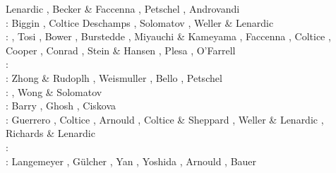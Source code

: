 \begin{scriptsize}
                    Lenardic \etal \cite{lemj11}, Becker \& Faccenna \cite{befa11},
                    Petschel \etal \cite{pewb11}, Androvandi \etal \cite{andl11}\\
\twothousandtwelve: Biggin \etal \cite{bisa12}, Coltice \etal \cite{cort12b}
                    Deschamps \etal \cite{deyt12}, Solomatov \cite{solo12}, 
                    Weller \& Lenardic \cite{wele12}\\
\twothousandthirteen: \cite{holj13}\cite{dadb13}, 
                      Tosi \etal \cite{toyd13}, Bower \etal \cite{bogs13a},
                      Burstedde \etal \cite{busa13}, Miyauchi \& Kameyama \cite{mika13},
                      Faccenna \etal \cite{fabc13}, Coltice \cite{cosr13},
                      Cooper \etal \cite{coml13}, Conrad \etal \cite{cost13},
                      Stein \& Hansen \cite{stha13}, Plesa \etal \cite{plth13},
                      O'Farrell \etal \cite{oflb13}\\
\twothousandfourteen: \cite{arfw14}\cite{helo14}\cite{crta14}\cite{flgw14}
                      \cite{roct14}\cite{cort14}\cite{becr14}
                      \cite{nata14}\cite{stha14}\cite{stlh14}\cite{ogaw14}\\
\twothousandfifteen: Zhong \& Rudoplh \cite{zhru15}, Weismuller \etal \cite{wegg15},
                     Bello \etal \cite{bect15}, Petschel \etal \cite{pesw15}\\
\twothousandsixteen: \cite{frbs16}\cite{sisc16}\cite{boba16}\cite{wele16}\cite{welm16}
                     \cite{vade16}\cite{chah16}, Wong \& Solomatov \cite{woso16b}\\
\twothousandseventeen: Barry \etal \cite{badw17}, Ghosh \etal \cite{ghts17}, 
                       Ciskova \etal \cite{civj17}\\
\twothousandeighteen: Guerrero \etal \cite{guld18}, Coltice \etal \cite{cold18}, 
                      Arnould \etal \cite{arcf18}, Coltice \& Sheppard \cite{cosh18}, 
                      Weller \& Lenardic \cite{wele18}, Richards \& Lenardic \cite{rile18}\\
\twothousandnineteen: \cite{gult19}\cite{mazh19}\cite{cohf19}\cite{lewh19}\cite{ulcw19}\cite{boba19}\cite{fube19}
      \cite{plju19}\\
\twothousandtwenty: Langemeyer \etal \cite{lalt20}, G\"ulcher \etal \cite{gugb20}, 
                    Yan \etal \cite{yabt20}, Yoshida \etal \cite{yosy20}, 
                    Arnould \etal \cite{arcf20}, Bauer \etal \cite{babd20}
\end{scriptsize}

